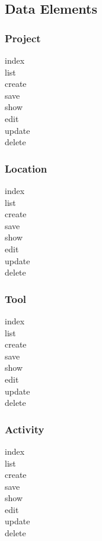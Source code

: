 \documentclass[12pt]{article}
\begin{document}
\subsection{Data Elements}

\subsubsection{Project}
 index\\
 list\\
 create\\
 save\\
 show\\
 edit\\
 update\\
delete\\

\subsubsection{Location}
 index\\
 list\\
 create\\
 save\\
 show\\
 edit\\
 update\\
delete\\

\subsubsection{Tool}
 index\\
 list\\
 create\\
 save\\
 show\\
 edit\\
 update\\
delete\\

\subsubsection{Activity}
 index\\
 list\\
 create\\
 save\\
 show\\
 edit\\
 update\\
delete\\
\end{document}
